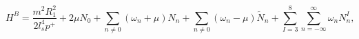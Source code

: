 \begin{equation}
H^B = \frac{m^2 R_1^2}{2 l_s^4 p^+} + 2 \mu N_0 + 
\sum_{n \neq 0}  (\omega_n + \mu) N_n  +
\sum_{n \neq 0}  (\omega_n - \mu) \tilde{N}_n +
\sum_{I=3}^8 \sum_{n = -\infty}^{\infty} \omega_n N_n^{I},
\end{equation}

